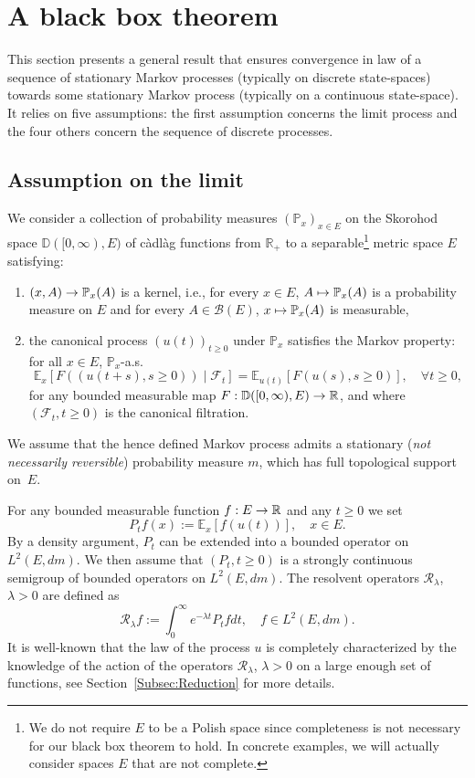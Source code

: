 \documentclass[10pt]{amsart}
\theoremstyle{definition}\newtheorem{defi}[theo]{Definition}\newtheorem{rema}[theo]{Remark}\newtheorem{exam}[theo]{Example}\newtheorem{exem}[theo]{Example}\newtheorem{nota}[theo]{Notation}
\theoremstyle{plain}
\newcommand{\bbD}{\mathbb{D}}
\newcommand{\cB}{\mathcal{B}}
\newcommand{\cF}{\mathcal{F}}
\newcommand{\cR}{\mathcal{R}}
\newcommand{\R}{\mathbb{R}}
\newcommand{\E}{\mathbb{E}}
\renewcommand{\P}{\mathbb{P}}
\let\oldforall\forall
\renewcommand*{\forall}{\mathrel{\oldforall}}
\renewcommand*{\to}{\mathchoice{\longrightarrow}{\rightarrow}{\rightarrow}{\rightarrow}}
\let\oldmapsto\mapsto
\renewcommand*{\mapsto}{\mathchoice{\longmapsto}{\oldmapsto}{\oldmapsto}{\oldmapsto}}
\begin{document}
\section{A black box theorem}\label{sec:ageneral}
This section presents a general result that ensures convergence in law of a sequence of stationary Markov processes (typically on discrete state-spaces) towards some stationary Markov process (typically on a continuous state-space). It relies on five assumptions: the first assumption concerns the limit process and the four others concern the sequence of discrete processes.

\subsection*{Assumption on the limit}

We consider a collection of probability measures $(\P_x)_{x\in E}$ on the Skorohod space $\bbD([0,\infty),E)$ of càdlàg functions from $\R_+$ to a separable\footnote{We do not require $E$ to be a Polish space since completeness is not necessary for our black box theorem to hold. In concrete examples, we will actually consider spaces $E$ that are not complete.} metric space $E$ satisfying:
\begin{enumerate}
\item $(x,A) \to \P_x(A)$ is a kernel, i.e., for every $x \in E$, $A\mapsto \P_x(A)$ is a probability measure on $E$ and for every $A\in\cB(E)$, $x\mapsto \P_x(A)$ is measurable,
\item the canonical process $(u(t))_{t\geq 0}$ under $\P_x$ satisfies the Markov property: for all $x\in E$, $\P_x$-a.s.
\[
\E_x[F((u(t+s),s\ge 0)) \mid  \cF_t] = \E_{u(t)}[F(u(s),s\ge 0)],\quad \forall t\ge 0,
\]
for any bounded measurable map $F:\bbD([0,\infty),E)\to\R$, and where $(\cF_t,t\ge 0)$ is the canonical filtration.
\end{enumerate}
We assume that the hence defined Markov process admits a stationary (\emph{not necessarily reversible}) probability measure $m$, which has full topological support on~$E$.

For any bounded measurable function $f:E\to \R$ and any $t\ge 0$ we set
\[
P_t f(x) := \E_x[f(u(t))],\quad x\in E.
\]
By a density argument, $P_t$ can be extended into a bounded operator on $L^2(E,dm)$. We then assume that $(P_t,t\ge 0)$ is a strongly continuous semigroup of bounded operators on $L^2(E,dm)$. The resolvent operators $\cR_\lambda$, $\lambda > 0$ are defined as
\[
\cR_\lambda f := \int_0^\infty e^{-\lambda t} P_t f dt,\quad f\in L^2(E,dm).
\]
It is well-known that the law of the process $u$ is completely characterized by the knowledge of the action of the operators $\cR_\lambda$, $\lambda > 0$ on a large enough set of functions, see Section~\ref{Subsec:Reduction} for more details.
\end{document}
